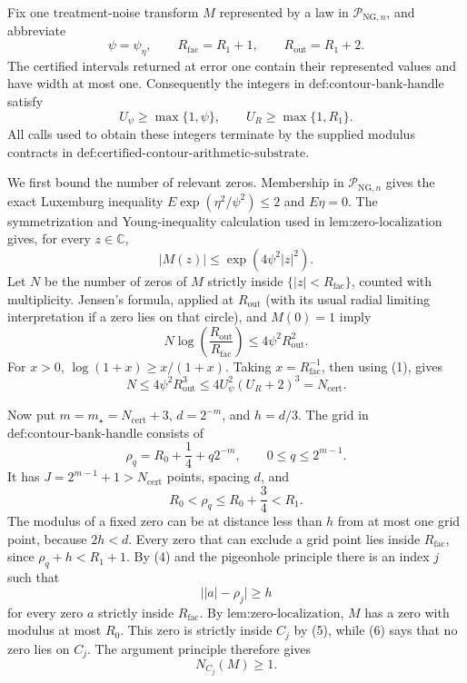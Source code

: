 Fix one treatment-noise transform \(M\) represented by a law in
\(\mathcal P_{\mathrm{NG},n}\), and abbreviate
\[
 \psi=\psi_{\eta},\qquad
 R_{\mathrm{fac}}=R_1+1,\qquad
 R_{\mathrm{out}}=R_1+2.
\]
The certified intervals returned at error one contain their represented
values and have width at most one.  Consequently the integers in
\(\text{def:contour-bank-handle}\) satisfy
\[
 U_{\psi}\ge\max\{1,\psi\},
 \qquad U_R\ge\max\{1,R_1\}.                                      \tag{1}
\]
All calls used to obtain these integers terminate by the supplied modulus
contracts in \(\text{def:certified-contour-arithmetic-substrate}\).

We first bound the number of relevant zeros.  Membership in
\(\mathcal P_{\mathrm{NG},n}\) gives the exact Luxemburg inequality
\(E\exp(\eta^2/\psi^2)\le2\) and \(E\eta=0\).  The symmetrization and
Young-inequality calculation used in \(\text{lem:zero-localization}\) gives,
for every \(z\in\mathbb C\),
\[
 |M(z)|\le \exp(4\psi^2|z|^2).                                    \tag{2}
\]
Let \(N\) be the number of zeros of \(M\) strictly inside
\(\{|z|<R_{\mathrm{fac}}\}\), counted with multiplicity.  Jensen's formula,
applied at \(R_{\mathrm{out}}\) (with its usual radial limiting
interpretation if a zero lies on that circle), and \(M(0)=1\) imply
\[
 N\log\!\left(\frac{R_{\mathrm{out}}}{R_{\mathrm{fac}}}\right)
 \le 4\psi^2R_{\mathrm{out}}^2.                                   \tag{3}
\]
For \(x>0\), \(\log(1+x)\ge x/(1+x)\).  Taking
\(x=R_{\mathrm{fac}}^{-1}\), then using (1), gives
\[
 N\le4\psi^2R_{\mathrm{out}}^3
 \le4U_{\psi}^2(U_R+2)^3=N_{\mathrm{cert}}.                       \tag{4}
\]

Now put \(m=m_{\star}=N_{\mathrm{cert}}+3\),
\(d=2^{-m}\), and \(h=d/3\).  The grid in
\(\text{def:contour-bank-handle}\) consists of
\[
 \rho_q=R_0+\frac14+q2^{-m},
 \qquad 0\le q\le2^{m-1}.
\]
It has \(J=2^{m-1}+1>N_{\mathrm{cert}}\) points, spacing \(d\), and
\[
 R_0<\rho_q\le R_0+\frac34<R_1.                                  \tag{5}
\]
The modulus of a fixed zero can be at distance less than \(h\) from at
most one grid point, because \(2h<d\).  Every zero that can exclude a grid
point lies inside \(R_{\mathrm{fac}}\), since \(\rho_q+h<R_1+1\).  By (4) and the pigeonhole
principle there is an index \(j\) such that
\[
 \bigl||a|-\rho_j\bigr|\ge h                                    \tag{6}
\]
for every zero \(a\) strictly inside \(R_{\mathrm{fac}}\).  By
\(\text{lem:zero-localization}\), \(M\) has a zero with modulus at most
\(R_0\).  This zero is strictly inside \(C_j\) by (5), while (6) says that
no zero lies on \(C_j\).  The argument principle therefore gives
\[
 N_{C_j}(M)\ge1.                                                   \tag{7}
\]


